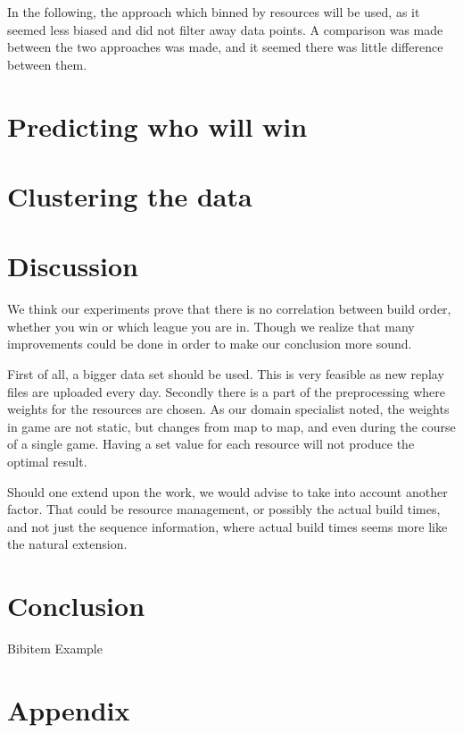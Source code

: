 \documentclass[a4paper,11pt]{article}
\begin{document}
In the following, the approach which binned by resources will be used, as it seemed less biased and did not filter away data points.
A comparison was made between the two approaches was made, and it seemed there was little difference between them.

\section{Predicting who will win}

\section{Clustering the data}

\section{Discussion}
We think our experiments prove that there is no correlation between build order, whether you win or which league you are in. Though we realize that many improvements could be done in order to make our conclusion more sound.

First of all, a bigger data set should be used. This is very feasible as new replay files are uploaded every day.
Secondly there is a part of the preprocessing where weights for the resources are chosen. As our domain specialist noted, the weights in game are not static, but changes from map to map, and even during the course of a single game. Having a set value for each resource will not produce the optimal result.

Should one extend upon the work, we would advise to take into account another factor. That could be resource management, or possibly the actual build times, and not just the sequence information, where actual build times seems more like the natural extension.

\section{Conclusion}


\newpage

\begin{thebibliography}{}

Bibitem Example


\end{thebibliography}

\section*{Appendix}
\appendix

%
\end{document}
